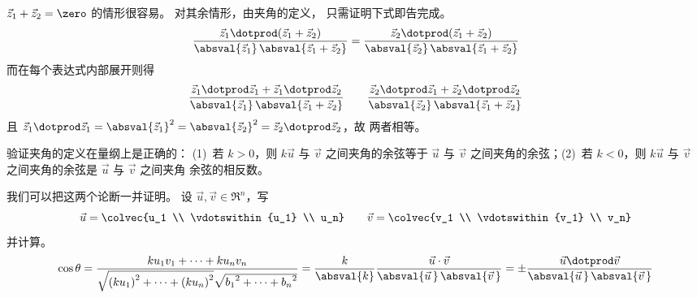 \begin{answer}
      \( \vec{z}_1+\vec{z}_2=\zero \) 的情形很容易。
      对其余情形，由夹角的定义， 
      只需证明下式即告完成。
      \begin{equation*}
        \frac{\vec{z}_1\dotprod(\vec{z}_1+\vec{z}_2)}{
              \absval{\vec{z}_1}\,\absval{\vec{z}_1+\vec{z}_2} }
        =
        \frac{\vec{z}_2\dotprod(\vec{z}_1+\vec{z}_2)}{
              \absval{\vec{z}_2}\,\absval{\vec{z}_1+\vec{z}_2} }
      \end{equation*}
      而在每个表达式内部展开则得
      \begin{equation*}
        \frac{\vec{z}_1\dotprod\vec{z}_1+\vec{z}_1\dotprod\vec{z}_2}{
              \absval{\vec{z}_1}\,\absval{\vec{z}_1+\vec{z}_2} }
        \qquad
        \frac{\vec{z}_2\dotprod\vec{z}_1+\vec{z}_2\dotprod\vec{z}_2}{
              \absval{\vec{z}_2}\,\absval{\vec{z}_1+\vec{z}_2} }
      \end{equation*}
      且 \( \vec{z}_1\dotprod\vec{z}_1=\absval{\vec{z}_1}^2
              =\absval{\vec{z}_2}^2=\vec{z}_2\dotprod\vec{z}_2 \)，故
      两者相等。  
    \end{answer}
  \item 
    验证夹角的定义在量纲上是正确的：
    (1)~若 \( k>0 \)，则 \( k\vec{u} \)
    与 \( \vec{v} \) 之间夹角的余弦等于 \( \vec{u} \)
    与 \( \vec{v} \) 之间夹角的余弦；(2)~若 \( k<0 \)，则 \( k\vec{u} \) 与 \( \vec{v} \)
    之间夹角的余弦是 \( \vec{u} \) 与 \( \vec{v} \) 之间夹角
    余弦的相反数。
    \begin{answer}
      我们可以把这两个论断一并证明。
      设 \( \vec{u}, \vec{v}\in\Re^n \)，写 
      \begin{equation*}
         \vec{u}=\colvec{u_1 \\ \vdotswithin{u_1} \\ u_n}
         \qquad
         \vec{v}=\colvec{v_1 \\ \vdotswithin{v_1} \\ v_n}
      \end{equation*}
      并计算。 
      \begin{equation*}
        \cos\theta=
        \frac{ku_1v_1+\cdots+ku_nv_n}{
             \sqrt{{(ku_1)}^2+\cdots+{(ku_n)}^2}\sqrt{{b_1}^2+\cdots+{b_n}^2} }
        =\frac{k}{\absval{k}}
        \frac{\vec{u}\cdot\vec{v}}{\absval{\vec{u}\,}\,\absval{\vec{v}\,} }
        =\pm
        \frac{\vec{u}\dotprod\vec{v}}{\absval{\vec{u}\,}\,\absval{\vec{v}\,} }
      \end{equation*}  
    \end{answer}
  \recommended \item 
